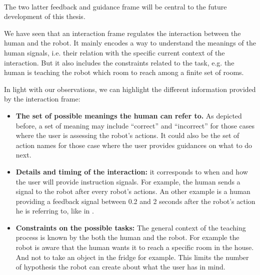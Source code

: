 \paragraph{} The two latter feedback and guidance frame will be central to the future development of this thesis. 

\transition

We have seen that an interaction frame regulates the interaction between the human and the robot. It mainly encodes a way to understand the meanings of the human signals, i.e. their relation with the specific current context of the interaction. But it also includes the constraints related to the task, e.g. the human is teaching the robot which room to reach among a finite set of rooms.

In light with our observations, we can highlight the different information provided by the interaction frame:

\begin{itemize}

\item \textbf{The set of possible meanings the human can refer to.} As depicted before, a set of meaning may include ``correct'' and ``incorrect'' for those cases where the user is assessing the robot's actions. It could also be the set of action names for those case where the user provides guidances on what to do next.

\item \textbf{Details and timing of the interaction:} it corresponds to when and how the user will provide instruction signals. For example, the human sends a signal to the robot after every robot's actions. An other example is a human providing a feedback signal between 0.2 and 2 seconds after the robot's action he is referring to, like in \cite{knox2009interactively}.

\item \textbf{Constraints on the possible tasks:} The general context of the teaching process is known by the both the human and the robot. For example the robot is aware that the human wants it to reach a specific room in the house. And not to take an object in the fridge for example. This limits the number of hypothesis the robot can create about what the user has in mind.

\end{itemize}

